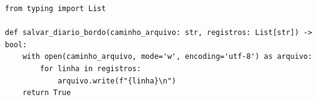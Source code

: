\ifmostrarGabarito
\begin{verbatim}
from typing import List

def salvar_diario_bordo(caminho_arquivo: str, registros: List[str]) -> bool:
    with open(caminho_arquivo, mode='w', encoding='utf-8') as arquivo:
        for linha in registros:
            arquivo.write(f"{linha}\n")
    return True
\end{verbatim}
\fi
